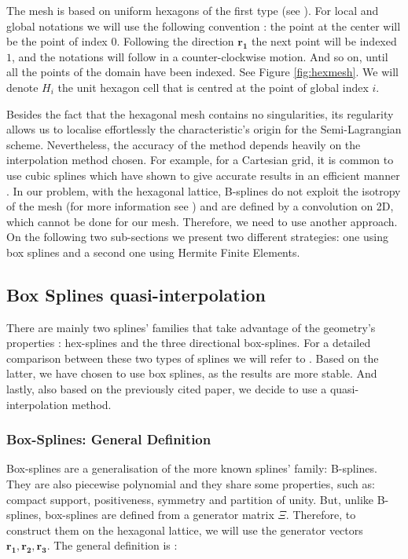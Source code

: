 \documentclass[proc]{edpsmath}
\begin{document}
The mesh is based on uniform hexagons of the first type (see \cite{Ulichney87}). For local and global notations we will use the following convention : the point at the center will be the point of index $0$. Following the direction $\mathbf{r_1}$ the next point will be indexed $1$, and the notations will follow in a counter-clockwise motion. And so on, until all the points of the domain have been indexed. See Figure \ref{fig:hexmesh}. We will denote $H_i$ the unit hexagon cell that is centred at the point of global index $i$.

Besides the fact that the hexagonal mesh contains no singularities, its regularity allows us to localise effortlessly the characteristic's origin for the Semi-Lagrangian scheme. Nevertheless, the accuracy of the method depends heavily on the interpolation method chosen. For example, for a Cartesian grid, it is common to use cubic splines which have shown to give accurate results in an efficient manner \cite{sonnendrucker:inria-00073296}. In our problem, with the hexagonal lattice, B-splines do not exploit the isotropy of the mesh (for more information see \cite{Mersereau79-IEEE}) and are defined by a convolution on 2D, which cannot be done for our mesh. Therefore, we need to use another approach. On the following two sub-sections we present two different strategies: one using box splines and a second one using Hermite Finite Elements.


\subsection{Box Splines quasi-interpolation}

There are mainly two splines' families that take advantage of the geometry's properties : hex-splines and the three directional box-splines. For a detailed comparison between these two types of splines we will refer to \cite{Condat2007}. Based on the latter, we have chosen to use box splines, as the results are more stable. And lastly, also based on the previously cited paper, we decide to use a quasi-interpolation method.

\subsubsection{Box-Splines: General Definition}

Box-splines are a generalisation of the more known splines' family: B-splines. They are also piecewise polynomial and they share some properties, such as: compact support, positiveness, symmetry and partition of unity. But, unlike B-splines, box-splines are defined from a generator matrix $\Xi$. Therefore, to construct them on the hexagonal lattice, we will use the generator vectors $\mathbf{r_1, r_2, r_3}$. The general definition is \cite{Boor1993, Condat2006}:
\end{document}
